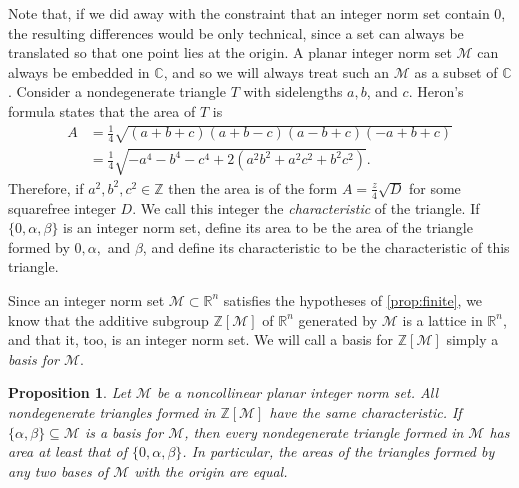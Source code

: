 \documentclass[10pt]{amsart}
\newcommand{\M}{\mathcal{M}}
\newcommand{\Z}{\mathbb{Z}}
\newcommand{\R}{\mathbb{R}}
\newcommand{\C}{\mathbb{C}}
\newtheorem{prop}[thm]{Proposition}
\begin{document}
Note that, if we did away with the constraint that an integer norm set contain 0, the resulting differences would be only technical, since a set can always be translated so that one point lies at the origin.  A planar integer norm set $\M$ can always be embedded in $\C$, and so we will always treat such an $\M$ as a subset of $\C$.  Consider a nondegenerate triangle $T$ with sidelengths $a,b$, and $c$.  Heron's formula states that the area of $T$ is
\begin{align*}
A &= \frac14 \sqrt{(a+b+c)(a+b-c)(a-b+c)(-a+b+c)} \\
&= \frac14 \sqrt{-a^4 - b^4 - c^4 + 2(a^2b^2 + a^2c^2 + b^2c^2)}.
\end{align*}
Therefore, if $a^2, b^2, c^2 \in \Z$ then the area is of the form $A = \frac{z}{4} \sqrt{D}$ for some squarefree integer $D$.  We call this integer the \emph{characteristic} of the triangle.  If $\{0,\alpha,\beta\}$ is an integer norm set, define its area to be the area of the triangle formed by $0, \alpha,$ and $\beta$, and define its characteristic to be the characteristic of this triangle.

Since an integer norm set $\M \subset \R^n$ satisfies the hypotheses of \ref{prop:finite}, we know that the additive subgroup $\Z[\M]$ of $\R^n$ generated by $\M$ is a lattice in $\R^n$, and that it, too, is an integer norm set.  We will call a basis for $\Z[\M]$ simply a \emph{basis for $\M$}.

\begin{prop}
\normalfont
Let $\M$ be a noncollinear planar integer norm set.  All nondegenerate triangles formed in $\Z[\M]$ have the same characteristic.  If $\{\alpha,\beta\} \subseteq \M$ is a basis for $\M$, then every nondegenerate triangle formed in $\M$ has area at least that of $\{0,\alpha,\beta\}$.  In particular, the areas of the triangles formed by any two bases of $\M$ with the origin are equal.
\end{prop}
\end{document}
